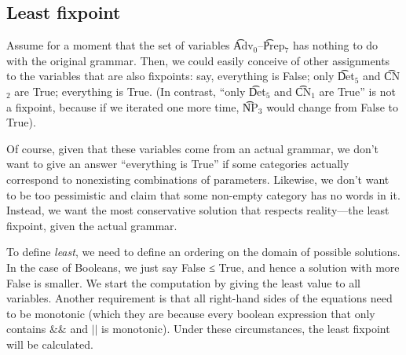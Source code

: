 \begin{EmptyItem}
\begin{HighlightingFancy}[]
\OtherTok{::=} \FunctionTok{&&} \FunctionTok{||} \FunctionTok{&&}  \NormalTok{;}
\OtherTok{::=} \FunctionTok{&&} \FunctionTok{||}  \NormalTok{;}
\OtherTok{::=} \FunctionTok{&&}  \NormalTok{;}
\OtherTok{::=} \FunctionTok{&&}  \NormalTok{;}
\OtherTok{::=} \FunctionTok{&&}  \NormalTok{;}
\OtherTok{::=}  \NormalTok{;}
\OtherTok{::=}  \NormalTok{;}
\OtherTok{::=}  \NormalTok{;}
\end{HighlightingFancy}
\end{EmptyItem}

\subsection{Least fixpoint}


Assume for a moment that the set of variables  \t{Adv$_\text{0}$}--\t{Prep$_\text{7}$} has nothing to do with the original \gf{} grammar. Then, we could easily conceive of other assignments to the variables that are also fixpoints: say, everything is False; only \t{Det$_\text{5}$} and \t{CN$_\text{2}$} are True; everything is True. (In contrast, “only \t{Det$_\text{5}$} and \t{CN$_\text{1}$} are True” is not a fixpoint, because if we iterated one more time, \t{NP$_\text{3}$} would change from False to True).

Of course, given that these variables come from an actual \gf{} grammar, we don’t want to give an answer “everything is True” if some categories actually correspond to nonexisting combinations of parameters. Likewise, we don’t want to be too pessimistic and claim that some non-empty category has no words in it. Instead, we want the most conservative solution that respects reality---the least fixpoint, given the actual \gf{} grammar.

To define \emph{least}, we need to define an ordering on the domain of possible solutions. In the case of Booleans, we just say False ≤ True, and hence a solution with more False is smaller. 
We start the computation by giving the least value to all variables.
Another requirement is that all right-hand sides of the equations need to be monotonic (which they are because every boolean expression that only contains $\&\&$ and $||$ is monotonic). Under these circumstances, the least fixpoint will be calculated.

